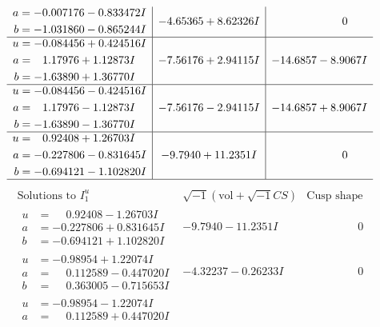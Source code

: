 \documentclass[1p]{elsarticle_modified}
\theoremstyle{definition}
\newcommand{\I}{\sqrt{-1}}
\begin{document}
$$\begin{array}{c|c|c}
\begin{aligned}
a &= -0.007176 - 0.833472 I \\
b &= -1.031860 - 0.865244 I\end{aligned}
 & -4.65365 + 8.62326 I & \phantom{-0.000000 } 0 \\ \hline\begin{aligned}
u &= -0.084456 + 0.424516 I \\
a &= \phantom{-}1.17976 + 1.12873 I \\
b &= -1.63890 + 1.36770 I\end{aligned}
 & -7.56176 + 2.94115 I & -14.6857 - 8.9067 I \\ \hline\begin{aligned}
u &= -0.084456 - 0.424516 I \\
a &= \phantom{-}1.17976 - 1.12873 I \\
b &= -1.63890 - 1.36770 I\end{aligned}
 & -7.56176 - 2.94115 I & -14.6857 + 8.9067 I \\ \hline\begin{aligned}
u &= \phantom{-}0.92408 + 1.26703 I \\
a &= -0.227806 - 0.831645 I \\
b &= -0.694121 - 1.102820 I\end{aligned}
 & -9.7940 + 11.2351 I & \phantom{-0.000000 } 0\\
 \hline 
 \end{array}$$\newpage$$\begin{array}{c|c|c}  
\text{Solutions to }I^u_{1}& \I (\text{vol} + \sqrt{-1}CS) & \text{Cusp shape}\\
 \hline 
\begin{aligned}
u &= \phantom{-}0.92408 - 1.26703 I \\
a &= -0.227806 + 0.831645 I \\
b &= -0.694121 + 1.102820 I\end{aligned}
 & -9.7940 - 11.2351 I & \phantom{-0.000000 } 0 \\ \hline\begin{aligned}
u &= -0.98954 + 1.22074 I \\
a &= \phantom{-}0.112589 - 0.447020 I \\
b &= \phantom{-}0.363005 - 0.715653 I\end{aligned}
 & -4.32237 - 0.26233 I & \phantom{-0.000000 } 0 \\ \hline\begin{aligned}
u &= -0.98954 - 1.22074 I \\
a &= \phantom{-}0.112589 + 0.447020 I \\

\end{aligned}
\end{array}$$
\end{document}
